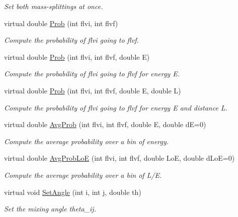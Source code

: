 \begin{DoxyCompactItemize}
\begin{DoxyCompactList}\small\item\em Set both mass-\/splittings at once. \end{DoxyCompactList}\item 
virtual double \hyperlink{classOscProb_1_1PMNS__Base_aec5c399b93261f1962a4b7dbbb44b973}{Prob} (int flvi, int flvf)
\begin{DoxyCompactList}\small\item\em Compute the probability of flvi going to flvf. \end{DoxyCompactList}\item 
virtual double \hyperlink{classOscProb_1_1PMNS__Base_aa3cee10639d5c0879ccb9e78d62128d3}{Prob} (int flvi, int flvf, double E)
\begin{DoxyCompactList}\small\item\em Compute the probability of flvi going to flvf for energy E. \end{DoxyCompactList}\item 
virtual double \hyperlink{classOscProb_1_1PMNS__Base_a6e0a74508d9d6db7be02e242b8467563}{Prob} (int flvi, int flvf, double E, double L)
\begin{DoxyCompactList}\small\item\em Compute the probability of flvi going to flvf for energy E and distance L. \end{DoxyCompactList}\item 
virtual double \hyperlink{classOscProb_1_1PMNS__Base_ac03f754160422e6600da8dbae0f803ed}{Avg\+Prob} (int flvi, int flvf, double E, double dE=0)
\begin{DoxyCompactList}\small\item\em Compute the average probability over a bin of energy. \end{DoxyCompactList}\item 
virtual double \hyperlink{classOscProb_1_1PMNS__Base_ac19a92f4ef428a7333ca8eed76fca637}{Avg\+Prob\+LoE} (int flvi, int flvf, double LoE, double d\+LoE=0)
\begin{DoxyCompactList}\small\item\em Compute the average probability over a bin of L/E. \end{DoxyCompactList}\item 
virtual void \hyperlink{classOscProb_1_1PMNS__Base_ace7875cf6d3bec161a2b7ed2690aec34}{Set\+Angle} (int i, int j, double th)
\begin{DoxyCompactList}\small\item\em Set the mixing angle theta\+\_\+ij. \end{DoxyCompactList}\item 

\end{DoxyCompactItemize}
